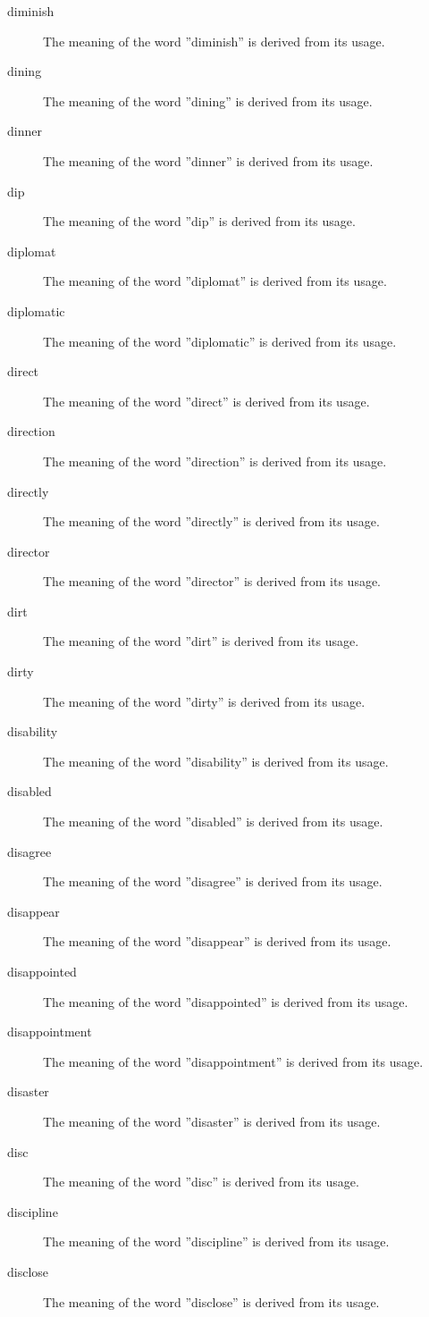 \documentclass[12pt, letterpaper]{memoir}
\begin{document}
\begin{description}
\item[diminish] The meaning of the word ''diminish'' is derived from its usage.
\item[dining] The meaning of the word ''dining'' is derived from its usage.
\item[dinner] The meaning of the word ''dinner'' is derived from its usage.
\item[dip] The meaning of the word ''dip'' is derived from its usage.
\item[diplomat] The meaning of the word ''diplomat'' is derived from its usage.
\item[diplomatic] The meaning of the word ''diplomatic'' is derived from its usage.
\item[direct] The meaning of the word ''direct'' is derived from its usage.
\item[direction] The meaning of the word ''direction'' is derived from its usage.
\item[directly] The meaning of the word ''directly'' is derived from its usage.
\item[director] The meaning of the word ''director'' is derived from its usage.
\item[dirt] The meaning of the word ''dirt'' is derived from its usage.
\item[dirty] The meaning of the word ''dirty'' is derived from its usage.
\item[disability] The meaning of the word ''disability'' is derived from its usage.
\item[disabled] The meaning of the word ''disabled'' is derived from its usage.
\item[disagree] The meaning of the word ''disagree'' is derived from its usage.
\item[disappear] The meaning of the word ''disappear'' is derived from its usage.
\item[disappointed] The meaning of the word ''disappointed'' is derived from its usage.
\item[disappointment] The meaning of the word ''disappointment'' is derived from its usage.
\item[disaster] The meaning of the word ''disaster'' is derived from its usage.
\item[disc] The meaning of the word ''disc'' is derived from its usage.
\item[discipline] The meaning of the word ''discipline'' is derived from its usage.
\item[disclose] The meaning of the word ''disclose'' is derived from its usage.

\end{description}
\end{document}
